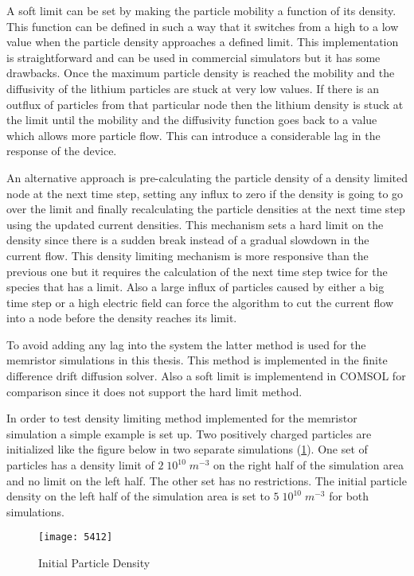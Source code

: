 \begin{doublespace}
A soft limit can be set by making the particle mobility a function of its density. This function can be defined in such a way that it switches from a high to a low value when the particle density approaches a defined limit. This implementation is straightforward and can be used in commercial simulators but it has some drawbacks. Once the maximum particle density is reached the mobility and the diffusivity of the lithium particles are stuck at very low values. If there is an outflux of particles from that particular node then the lithium density is stuck at the limit until the mobility and the diffusivity function goes back to a value which allows more particle flow. This can introduce a considerable lag in the response of the device.  

An alternative approach is pre-calculating the particle density of a density limited node at the next time step, setting any influx to zero if the density is going to go over the limit and finally recalculating the particle densities at the next time step using the updated current densities. This mechanism sets a hard limit on the density since there is a sudden break instead of a gradual slowdown in the current flow. This density limiting mechanism is more responsive than the previous one but it requires the calculation of the next time step twice for the species that has a limit. Also a large influx of particles caused by either a big time step or a high electric field can force the algorithm to cut the current flow into a node before the density reaches its limit.

To avoid adding any lag into the system the latter method is used for the memristor simulations in this thesis. This method is implemented in the finite difference drift diffusion solver. Also a soft limit is implementend in COMSOL for comparison since it does not support the hard limit method.  

In order to test density limiting method implemented for the memristor simulation a simple example is set up. Two positively charged particles are initialized like the figure below in two separate simulations (\ref{5412}). One set of particles has a density limit of $2 \; 10^{10} \; m^{-3}$ on the right half of the simulation area and no limit on the left half. The other set has no restrictions. The initial particle density on the left half of the simulation area is set to $5 \; 10^{10} \; m^{-3}$ for both simulations.
\begin{figure}[!htp]
\centering
\texttt{[image: 5412]}
\caption{Initial Particle Density} 
\label{5412}
\end{figure}


\end{doublespace}
